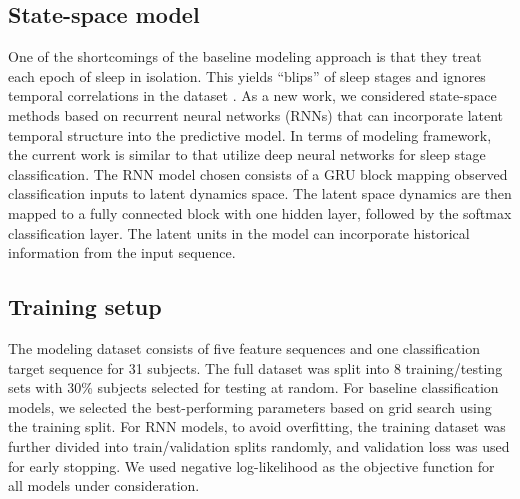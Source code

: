 \documentclass[12pt]{article}
\begin{document}
\subsection{State-space model} One of the shortcomings of the baseline modeling approach is that they treat each epoch of sleep in isolation. This yields ``blips'' of sleep stages and ignores temporal correlations in the dataset . As a new work, we considered state-space methods based on recurrent neural networks (RNNs) that can incorporate latent temporal structure into the predictive model. In terms of modeling framework, the current work is similar to \citet{radha2019sleep,haghayegh2021deep} that utilize deep neural networks for sleep stage classification. The RNN model chosen consists of a GRU block \citep{cho2014learning} mapping observed classification inputs to latent dynamics space. The latent space dynamics are then mapped to a fully connected block with one hidden layer, followed by the softmax classification layer. The latent units in the model can incorporate historical information from the input sequence. 


\subsection{Training setup} The modeling dataset consists of five feature sequences and one classification target sequence for 31 subjects. The full dataset was split into 8 training/testing sets with 30\% subjects selected for testing at random. For baseline classification models, we selected the best-performing parameters based on grid search using the training split. For RNN models, to avoid overfitting, the training dataset was further divided into train/validation splits randomly, and validation loss was used for early stopping. We used negative log-likelihood as the objective function for all models under consideration.


\end{document}
